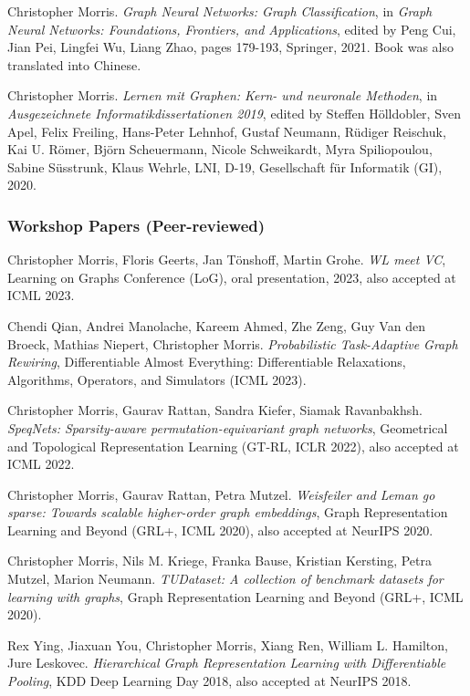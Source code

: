 \documentclass[11pt, a4paper, DIV=14, headings=small]{scrartcl}
\begin{document}
\begin{thebibliography}{15}
		Christopher Morris.
		\emph{Graph Neural Networks: Graph Classification},
		in \emph{Graph Neural Networks: Foundations, Frontiers, and Applications}, edited by Peng Cui, Jian Pei, Lingfei Wu, Liang Zhao, pages 179-193, Springer, 2021. Book was also translated into Chinese.
		
		Christopher Morris.
		\emph{Lernen mit Graphen: Kern- und neuronale Methoden}, in
		\emph{Ausgezeichnete Informatikdissertationen 2019}, edited by Steffen H{\"o}lldobler, Sven Apel, Felix Freiling, Hans-Peter Lehnhof, Gustaf Neumann, R{\"u}diger Reischuk, Kai U. R{\"o}mer, Bj{\"o}rn Scheuermann, Nicole Schweikardt, Myra Spiliopoulou, Sabine S{\"u}sstrunk, Klaus Wehrle, LNI, D-19, Gesellschaft f{\"u}r Informatik (GI), 2020.
		
		\subsubsection*{Workshop Papers (Peer-reviewed)}
		Christopher Morris, Floris Geerts, Jan Tönshoff, Martin Grohe.
		\emph{WL meet VC},
		Learning on Graphs Conference  (LoG), oral 			presentation, 2023, also accepted at ICML 2023.
						
		Chendi Qian, Andrei Manolache, Kareem Ahmed, Zhe Zeng, Guy Van den Broeck, Mathias Niepert, Christopher Morris.
		\emph{Probabilistic Task-Adaptive Graph Rewiring}, Differentiable Almost Everything: Differentiable Relaxations, Algorithms, Operators, and Simulators (ICML 2023).

		
		Christopher Morris, Gaurav Rattan, Sandra Kiefer, Siamak Ravanbakhsh.
		\emph{SpeqNets: Sparsity-aware permutation-equivariant graph networks},
		Geometrical and Topological Representation Learning (GT-RL, ICLR 2022), also accepted at ICML 2022.
		
		Christopher Morris, Gaurav Rattan, Petra Mutzel.
		\emph{Weisfeiler and Leman go sparse: Towards scalable higher-order graph embeddings},
		Graph Representation Learning and Beyond (GRL+, ICML 2020), also accepted at NeurIPS 2020.
		
		Christopher Morris, Nils M. Kriege, Franka Bause, Kristian Kersting, Petra Mutzel, Marion Neumann.
		\emph{TUDataset: A collection of benchmark datasets for learning with graphs},
		Graph Representation Learning and Beyond (GRL+, ICML 2020).
		
		Rex Ying, Jiaxuan You, Christopher Morris, Xiang Ren, William L. Hamilton, Jure Leskovec.
		\emph{Hierarchical Graph Representation Learning with Differentiable Pooling},
		KDD Deep Learning Day 2018, also accepted at NeurIPS 2018.
		

\end{thebibliography}
\end{document}
